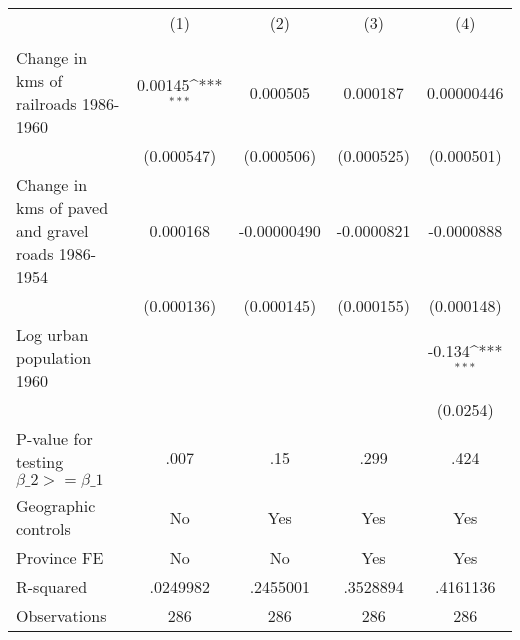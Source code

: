 {
\def\sym#1{\ifmmode^{#1}\else\(^{#1}\)\fi}
\begin{tabular}{l*{4}{c}}
\hline\hline
                &\multicolumn{1}{c}{(1)}&\multicolumn{1}{c}{(2)}&\multicolumn{1}{c}{(3)}&\multicolumn{1}{c}{(4)}\\
                &\multicolumn{1}{c}{}&\multicolumn{1}{c}{}&\multicolumn{1}{c}{}&\multicolumn{1}{c}{}\\
\hline
Change in kms of railroads 1986-1960&  0.00145\sym{***}& 0.000505         & 0.000187         &0.00000446         \\
                &(0.000547)         &(0.000506)         &(0.000525)         &(0.000501)         \\
[1em]
Change in kms of paved and gravel roads 1986-1954& 0.000168         &-0.00000490         &-0.0000821         &-0.0000888         \\
                &(0.000136)         &(0.000145)         &(0.000155)         &(0.000148)         \\
[1em]
Log urban population 1960&                  &                  &                  &   -0.134\sym{***}\\
                &                  &                  &                  & (0.0254)         \\
\hline
P-value for testing $\beta\_{2} >= \beta\_{1}$&     .007         &      .15         &     .299         &     .424         \\
Geographic controls&       No         &      Yes         &      Yes         &      Yes         \\
Province FE     &       No         &       No         &      Yes         &      Yes         \\
R-squared       & .0249982         & .2455001         & .3528894         & .4161136         \\
Observations    &      286         &      286         &      286         &      286         \\
\hline\hline
\end{tabular}
}
